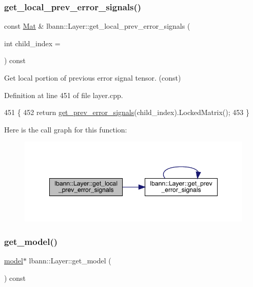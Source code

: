 \subsubsection{\texorpdfstring{get\+\_\+local\+\_\+prev\+\_\+error\+\_\+signals()}{get\_local\_prev\_error\_signals()}\hspace{0.1cm}{\footnotesize\ttfamily [2/2]}}
{\footnotesize\ttfamily const \hyperlink{base_8hpp_a68f11fdc31b62516cb310831bbe54d73}{Mat} \& lbann\+::\+Layer\+::get\+\_\+local\+\_\+prev\+\_\+error\+\_\+signals (\begin{DoxyParamCaption}\item[{int}]{child\+\_\+index = {} }\end{DoxyParamCaption}) const}

Get local portion of previous error signal tensor. (const) 

Definition at line 451 of file layer.\+cpp.


\begin{DoxyCode}
451                                                                     \{
452   \textcolor{keywordflow}{return} \hyperlink{classlbann_1_1Layer_a7ac4579d3c1671dfaf86e3b618d6938a}{get\_prev\_error\_signals}(child\_index).LockedMatrix();
453 \}
\end{DoxyCode}
Here is the call graph for this function\+:\nopagebreak
\begin{figure}[H]
\begin{center}
\leavevmode
\includegraphics[width=348pt]{classlbann_1_1Layer_af3490fe9011ef620b827970bc5dcc7a7_cgraph}
\end{center}
\end{figure}
\mbox{\label{classlbann_1_1Layer_afcfb6f55d12c728a59d107fe2d2fff0d}} 
\subsubsection{\texorpdfstring{get\+\_\+model()}{get\_model()}}
{\footnotesize\ttfamily \hyperlink{classlbann_1_1model}{model}$\ast$ lbann\+::\+Layer\+::get\+\_\+model (\begin{DoxyParamCaption}{ }\end{DoxyParamCaption}) const\hspace{0.3cm}{\ttfamily [inline]}}

